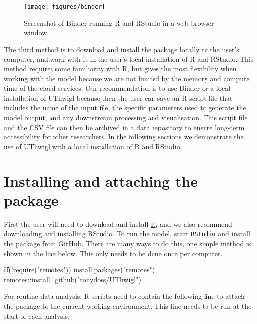 \documentclass[]{elsarticle} %
\newenvironment{Shaded}{\begin{snugshade}}{\end{snugshade}}
\newcommand{\ControlFlowTok}[1]{\textcolor[rgb]{0.13,0.29,0.53}{\textbf{#1}}}
\newcommand{\FunctionTok}[1]{\textcolor[rgb]{0.00,0.00,0.00}{#1}}
\newcommand{\NormalTok}[1]{#1}
\newcommand{\SpecialCharTok}[1]{\textcolor[rgb]{0.00,0.00,0.00}{#1}}
\newcommand{\StringTok}[1]{\textcolor[rgb]{0.31,0.60,0.02}{#1}}
\begin{document}
\begin{figure}
\texttt{[image: figures/binder]} \caption{Screenshot of Binder running R and RStudio in a web browser window.}\label{fig:binderfig}
\end{figure}

The third method is to download and install the package locally to the user's computer, and work with it in the user's local installation of R and RStudio. This method requires some familiarity with R, but gives the most flexibility when working with the model because we are not limited by the memory and compute time of the cloud services. Our recommendation is to use Binder or a local installation of UThwigl because then the user can save an R script file that includes the name of the input file, the specific parameters used to generate the model output, and any downstream processing and visualisation. This script file and the CSV file can then be archived in a data repository to ensure long-term accessibility for other researchers. In the following sections we demonstrate the use of UThwigl with a local installation of R and RStudio.

\hypertarget{installing-and-attaching-the-package}{%
\section{Installing and attaching the package}\label{installing-and-attaching-the-package}}

First the user will need to download and install \href{https://www.r-project.org/}{R}, and we also recommend downloading and installing \href{https://www.rstudio.com/}{RStudio}. To run the model, start \texttt{RStudio} and install the package from GitHub. There are many ways to do this, one simple method is shown in the line below. This only needs to be done once per computer.

\begin{Shaded}
\begin{Highlighting}[]
\ControlFlowTok{if}\NormalTok{(}\SpecialCharTok{!}\FunctionTok{require}\NormalTok{(}\StringTok{"remotes"}\NormalTok{)) }\FunctionTok{install.packages}\NormalTok{(}\StringTok{"remotes"}\NormalTok{)}
\NormalTok{remotes}\SpecialCharTok{::}\FunctionTok{install\_github}\NormalTok{(}\StringTok{"tonydoss/UThwigl"}\NormalTok{)}
\end{Highlighting}
\end{Shaded}

For routine data analysis, R scripts need to contain the following line to attach the package to the current working environment. This line needs to be run at the start of each analysis:
\end{document}
